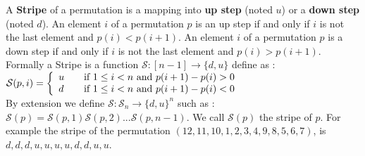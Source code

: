 \documentclass[a4paper]{llncs}
\newcommand{\Perm}[1]{\mathcal{S}_{#1}}
\newcounter{num}
\newcommand{\num}{\stepcounter{num} }
\newcommand{\numl}[1]{\refstepcounter{num}\label{#1}}
\newcommand{\dstep}{d}
\newcommand{\ustep}{u}
\begin{document}
		
		A \textbf{Stripe} of a permutation
		is a mapping into \textbf{up step} (noted $\ustep$) 
		or a \textbf{down step} (noted $\dstep$).
		An element $i$ of a permutation $p$ is an up step if and only if $i$ is not the last element and $p(i)<p(i+1)$.
		An element $i$ of a permutation $p$ is a down step if and only if $i$ is not the last element and $p(i)>p(i+1)$.\\	
		Formally a Stripe is a function $\mathcal{S} : [n-1] \to \{\dstep,\ustep\}$ define as :\\
		$ \mathcal{S}(p,i) = \left\{ 
		  \begin{array}{l l}
		    \ustep & \quad \text{if $1 \leq i<n$ and $p(i+1)-p(i)>0$ }\\
		    \dstep & \quad \text{if $1 \leq i<n$ and $p(i+1)-p(i)<0$ }\\
		  \end{array} \right. $\\
		  
		By extension we define  $\mathcal{S} : \Perm{n} \to \{\dstep,\ustep\}^{n}$ such as :
		$\mathcal{S}(p)=\mathcal{S}(p,1)\mathcal{S}(p,2)...\mathcal{S}(p,n-1)$.
		We call $\mathcal{S}(p)$ the stripe of $p$.
		For example the stripe of the permutation $(12,11,10,1,2,3,4,9,8,5,6,7)$, 
		is $\dstep,\dstep,\dstep,\ustep,\ustep,\ustep,\ustep,\dstep,\dstep,\ustep,\ustep$.\\
		  
	  			 		  	
		
\end{document}
